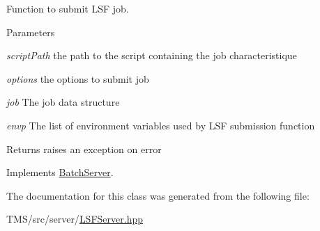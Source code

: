 Function to submit LSF job. 


\begin{DoxyParams}{Parameters}
\item[{\em scriptPath}]the path to the script containing the job characteristique \item[{\em options}]the options to submit job \item[{\em job}]The job data structure \item[{\em envp}]The list of environment variables used by LSF submission function \end{DoxyParams}
\begin{DoxyReturn}{Returns}
raises an exception on error 
\end{DoxyReturn}


Implements \hyperlink{classBatchServer_a078c0f8605e770c02b8eca0351526f59}{BatchServer}.



The documentation for this class was generated from the following file:\begin{DoxyCompactItemize}
\item 
TMS/src/server/\hyperlink{LSFServer_8hpp}{LSFServer.hpp}\end{DoxyCompactItemize}
